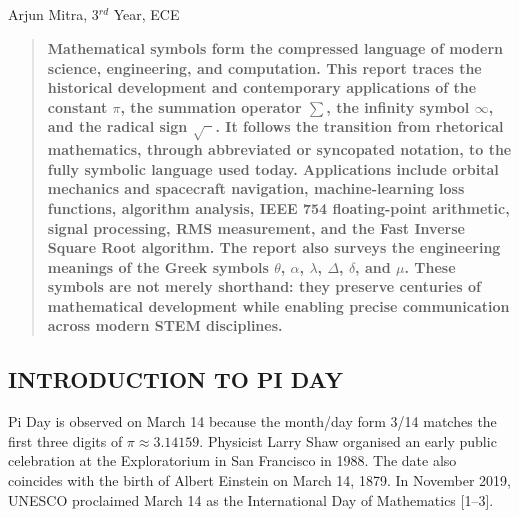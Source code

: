 \vspace{-10pt}
\begin{center}
  \section{}
  Arjun Mitra, 3$^{rd}$ Year, ECE
\end{center}
\vspace{-6pt}

\setcounter{figure}{0}
\setcounter{table}{0}

\begin{multicols}{2}
  \begin{abstract}
    \bfseries
    Mathematical symbols form the compressed language of modern science, engineering, and computation. This report traces the historical development and contemporary applications of the constant $\pi$, the summation operator $\sum$, the infinity symbol $\infty$, and the radical sign $\sqrt{\phantom{x}}$. It follows the transition from rhetorical mathematics, through abbreviated or syncopated notation, to the fully symbolic language used today. Applications include orbital mechanics and spacecraft navigation, machine-learning loss functions, algorithm analysis, IEEE 754 floating-point arithmetic, signal processing, RMS measurement, and the Fast Inverse Square Root algorithm. The report also surveys the engineering meanings of the Greek symbols $\theta$, $\alpha$, $\lambda$, $\Delta$, $\delta$, and $\mu$. These symbols are not merely shorthand: they preserve centuries of mathematical development while enabling precise communication across modern STEM disciplines.
  \end{abstract}

  \vspace{12pt}\subsection*{\centering\uppercase{Introduction to Pi Day}}
  Pi Day is observed on March 14 because the month/day form 3/14 matches the first three digits of $\pi\approx3.14159$. Physicist Larry Shaw organised an early public celebration at the Exploratorium in San Francisco in 1988. The date also coincides with the birth of Albert Einstein on March 14, 1879. In November 2019, UNESCO proclaimed March 14 as the International Day of Mathematics [1--3].


\end{multicols}
